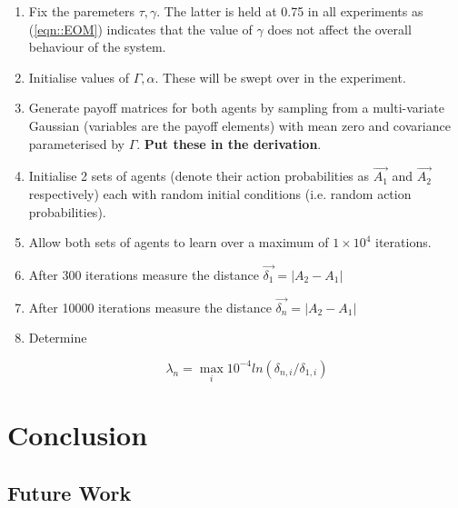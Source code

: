 \documentclass[letterpaper]{article} %
\begin{document}
   \begin{enumerate}
   	\item Fix the paremeters $\tau, \gamma$. The latter is held at 0.75 in all experiments as (\ref{eqn::EOM}) indicates that the value of $\gamma$ does not affect the overall behaviour of the system.
   	\item Initialise values of $\Gamma, \alpha$. These will be swept over in the experiment.
	\item Generate payoff matrices for both agents by sampling from a multi-variate Gaussian 
    (variables are the payoff elements) with mean zero and covariance parameterised by $\Gamma$. \textbf{Put these in the derivation}.
    \item Initialise 2 sets of agents (denote their action probabilities as $\Vec{A_1}$ and $\Vec{A_2}$ respectively) each with random initial conditions (i.e. random action probabilities).
    \item Allow both sets of agents to learn over a maximum of $1 \times 10^4$ iterations.
    \item After 300 iterations measure the distance $\Vec{\delta_1} = |A_2 - A_1|$
    \item After 10000 iterations measure the distance $\Vec{\delta_n} = |A_2 - A_1|$
    \item Determine 

    \begin{equation}
        \lambda_n = \max_{i} 10^{-4} ln(\delta_{n, i}/\delta_{1, i})
    \end{equation}

   \end{enumerate}

\section{Conclusion}

\subsection{Future Work}




\end{document}
